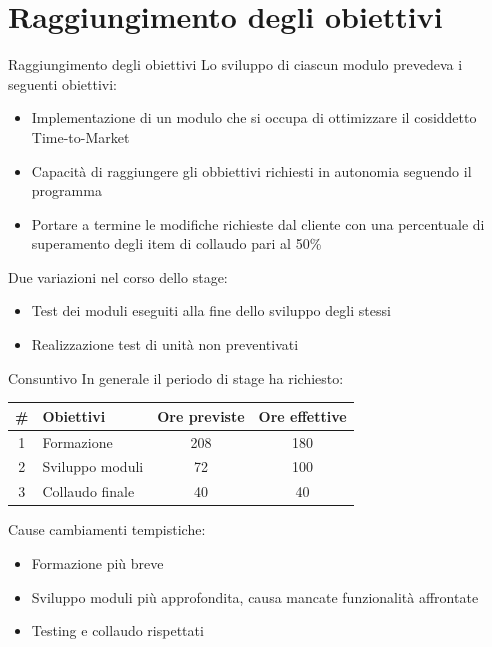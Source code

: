 \documentclass{beamer}
\begin{document}
\section{Raggiungimento degli obiettivi}
\begin{frame}{Raggiungimento degli obiettivi}
	Lo sviluppo di ciascun modulo prevedeva i seguenti obiettivi:
	\begin{itemize}
		\item Implementazione di un modulo che si occupa di ottimizzare il cosiddetto Time-to-Market
		\item Capacità di raggiungere gli obbiettivi richiesti in autonomia
		seguendo il programma	
		\item Portare a termine le modifiche richieste dal cliente con una percentuale di superamento degli item di collaudo pari al 50\%
	\end{itemize}
	
	Due variazioni nel corso dello stage:
	\begin{itemize}
		\item Test dei moduli eseguiti alla fine dello sviluppo degli stessi
		\item Realizzazione test di unità non preventivati
	\end{itemize}
\end{frame}



\begin{frame}{Consuntivo}
	In generale il periodo di stage ha richiesto:
	\begin{center}
		\begin{tabular}{|c|l|c|c|}
			\hline
			\textbf{\#} & \textbf{Obiettivi} & \textbf{Ore previste} & \textbf{Ore effettive} \\\hline
			1           & Formazione               & 208                   & 180                   \\\hline
			2           & Sviluppo moduli            & 72                    & 100                     \\\hline
			3           & Collaudo finale      & 40                     & 40                     \\\hline
		\end{tabular}
	\end{center}
	Cause cambiamenti tempistiche:
	\begin{itemize}
		\item Formazione pi\`u breve
		\item Sviluppo moduli più approfondita, causa mancate funzionalità affrontate
		\item Testing e collaudo rispettati
	\end{itemize}
\end{frame}
\end{document}
